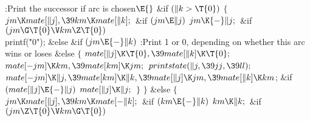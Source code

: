 \Y\B\4:Print the successor if arc  is chosen\X${}\E{}$\6
\&{if} ${}(\|k>\T{0}){}$\5
${}\{{}$\1\6
${}\\{jm}\K\\{mate}[\|j],\39\\{km}\K\\{mate}[\|k];{}$\6
\&{if} ${}(\\{jm}\E\|j){}$\1\5
${}\\{jm}\K{-}\|j;{}$\2\6
\&{if} ${}(\\{jm}\G\T{0}\V\\{km}\Z\T{0}){}$\1\5
\\{printf}(\.{"0"});\2\6
\&{else} \&{if} ${}(\\{jm}\E{-}\|k){}$\1\5
:Print 1 or 0, depending on whether this arc wins or loses\X\2\6
\&{else}\5
${}\{{}$\1\6
${}\\{mate}[\|j]\K\T{0},\39\\{mate}[\|k]\K\T{0};{}$\6
${}\\{mate}[{-}\\{jm}]\K\\{km},\39\\{mate}[\\{km}]\K\\{jm};{}$\6
${}\\{printstate}(\|j,\39\\{jj},\39\\{ll});{}$\6
${}\\{mate}[{-}\\{jm}]\K\|j,\39\\{mate}[\\{km}]\K\|k,\39\\{mate}[\|j]\K\\{jm},%
\39\\{mate}[\|k]\K\\{km}{}$;\6
\&{if} ${}(\\{mate}[\|j]\E{-}\|j){}$\1\5
${}\\{mate}[\|j]\K\|j;{}$\2\6
\4${}\}{}$\2\6
\4${}\}{}$\5
\2\&{else}\5
${}\{{}$\1\6
${}\\{jm}\K\\{mate}[\|j],\39\\{km}\K\\{mate}[{-}\|k];{}$\6
\&{if} ${}(\\{km}\E{-}\|k){}$\1\5
${}\\{km}\K\|k;{}$\2\6
\&{if} ${}(\\{jm}\Z\T{0}\V\\{km}\G\T{0}){}$\1\5
